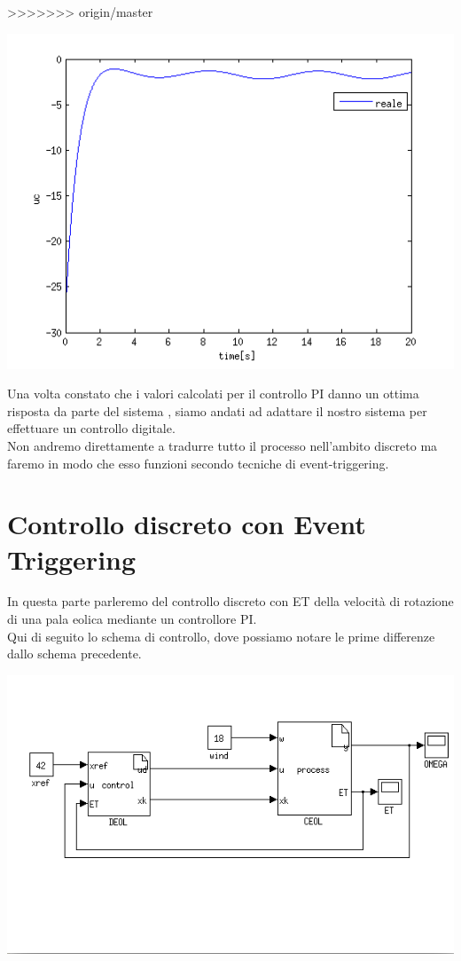 \documentclass[a4paper,13pt]{article}
\begin{document}
>>>>>>> origin/master
\begin{center}
\includegraphics[scale=0.6]{graph/ucontsin.png}
\end{center}

Una volta constato che i valori calcolati per il controllo PI danno un ottima risposta 
da parte del sistema , siamo andati ad adattare il nostro sistema per effettuare un controllo digitale.\\
Non andremo direttamente a tradurre tutto il processo nell'ambito discreto ma faremo in modo che esso funzioni secondo tecniche di event-triggering.

\section{Controllo discreto con Event Triggering}

	In questa parte parleremo del controllo discreto con ET della velocità di rotazione di una pala eolica mediante un
	controllore PI.\\ Qui di seguito lo schema di controllo, dove possiamo notare le prime differenze dallo schema 				precedente.
	
\begin{center}
\includegraphics[scale=0.6]{eoltrig.png}
\end{center}
\end{document}
